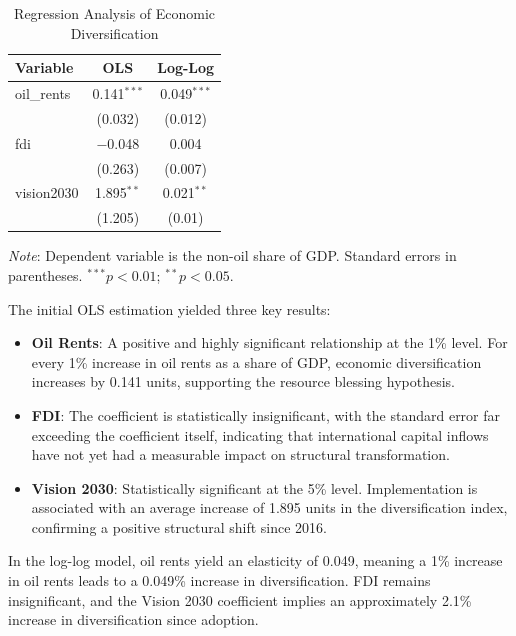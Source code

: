 \documentclass[12pt, a4paper]{article}
\begin{document}
\begin{table}[H]
\centering
\begin{threeparttable}
\caption{Regression Analysis of Economic Diversification}
\label{tab:regression}
\begin{tabular}{lcc}
    \toprule
    \textbf{Variable} & \textbf{OLS} & \textbf{Log-Log} \\
    \midrule
    oil\_rents  & 0.141$^{***}$ & 0.049$^{***}$ \\
                & (0.032)       & (0.012)       \\[4pt]
    fdi         & $-$0.048      & 0.004         \\
                & (0.263)       & (0.007)       \\[4pt]
    vision2030  & 1.895$^{**}$  & 0.021$^{**}$  \\
                & (1.205)       & (0.01)        \\
    \bottomrule
\end{tabular}
\begin{tablenotes}
    \small
    \item \textit{Note}: Dependent variable is the non-oil share of GDP. Standard errors in parentheses. $^{***}p < 0.01$; $^{**}p < 0.05$.
\end{tablenotes}
\end{threeparttable}
\end{table}

The initial OLS estimation yielded three key results:

\begin{itemize}
    \item \textbf{Oil Rents}: A positive and highly significant relationship at the 1\% level. For every 1\% increase in oil rents as a share of GDP, economic diversification increases by 0.141 units, supporting the resource blessing hypothesis.
    \item \textbf{FDI}: The coefficient is statistically insignificant, with the standard error far exceeding the coefficient itself, indicating that international capital inflows have not yet had a measurable impact on structural transformation.
    \item \textbf{Vision 2030}: Statistically significant at the 5\% level. Implementation is associated with an average increase of 1.895 units in the diversification index, confirming a positive structural shift since 2016.
\end{itemize}

In the log-log model, oil rents yield an elasticity of 0.049, meaning a 1\% increase in oil rents leads to a 0.049\% increase in diversification. FDI remains insignificant, and the Vision 2030 coefficient implies an approximately 2.1\% increase in diversification since adoption.
\end{document}
